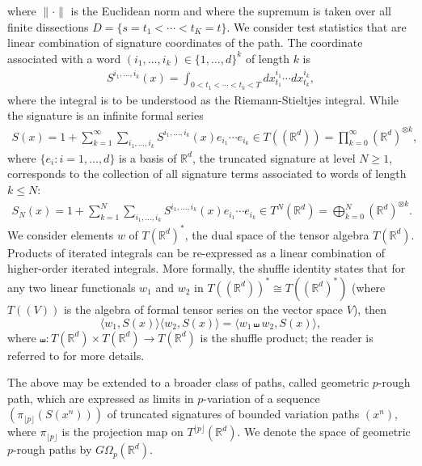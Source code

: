 \documentclass[twoside,11pt]{article}
\numberwithin{equation}{section}
\numberwithin{theorem}{section}
\newcommand{\R}{\mathbb{R}}
\begin{document}
where $\|\cdot\|$ is the Euclidean norm and where the supremum is taken over all finite dissections $D = \{s = t_1 < \cdots < t_K = t\}$. We consider test statistics that are linear combination of signature coordinates of the path. The coordinate associated with a word $(i_1,\ldots, i_k)\in\{1,\ldots,d\}^k$ of length $k$ is 
\begin{align*}
    S^{i_1,\ldots,i_k}(x)=\int_{0<t_1<\cdots<t_k<T} dx^{i_1}_{t_1}\cdots dx^{i_k}_{t_k},
\end{align*}
where the integral is to be understood as the Riemann-Stieltjes integral. While the signature is an infinite formal series
\begin{align*}
S(x)=1+\sum_{k=1}^{\infty}\sum_{i_1,\ldots,i_k} S^{i_1,\ldots,i_k}(x)e_{i_1}\cdots e_{i_k}  \in T((\R^d))=\prod_{k=0}^\infty(\R^d)^{\otimes k},
\end{align*}
where $\{e_i:i=1, \ldots, d\}$ is a basis of $\R^d$, the truncated signature at level $N\geq 1$, corresponds to the collection of all signature terms associated to words of length $k \leq N$:
\begin{align}\label{eq:truncated_signature}
S_N(x)=1+\sum_{k=1}^{N}\sum_{i_1,\ldots,i_k} S^{i_1,\ldots,i_k}(x)e_{i_1}\cdots e_{i_k}  \in T^N(\R^d)=\bigoplus_{k=0}^{N}(\R^d)^{\otimes k}.
\end{align}
We consider elements $w$ of $T(\R^d)^*$, the dual space of the tensor algebra $T(\R^d)$. Products of iterated integrals can be re-expressed
as a linear combination of higher-order iterated integrals. More formally, the shuffle identity states that for any two linear functionals $w_1$ and $w_2$ in $T((\R^d))^*\cong T((\R^d)^*)$ (where $T((V))$ is the algebra of formal tensor series on the vector space $V$), then
\begin{equation}\label{eq:shuffle}
    \langle w_1, S(x)\rangle\langle w_2, S(x)\rangle = \langle w_1\shuffle w_2 , S(x)\rangle,
\end{equation}
where $\shuffle:T(\R^d)\times T(\R^d)\to T(\R^d)$ is the shuffle product; the reader is referred to \cite[Section 1.3.3]{cass2024lecture} for more details. 

The above may be extended to a broader class of paths, called geometric $p$-rough path, which are expressed as limits in $p$-variation of a sequence $(\pi_{\lfloor p\rfloor}(S(x^n)))$ of truncated signatures of bounded variation paths $(x^n)$, where $\pi_{\lfloor p\rfloor}$ is the projection map on $T^{\lfloor p\rfloor}(\R^d)$. We denote the space of geometric $p$-rough paths by $G\Omega_p(\R^d)$.
\end{document}
